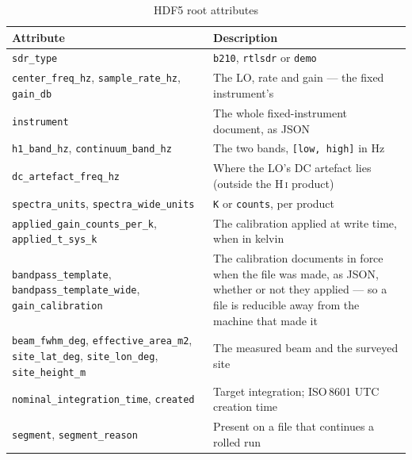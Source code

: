 \documentclass[11pt,a4paper]{article}
\begin{document}
\begin{table}[H]
\centering
\caption{HDF5 root attributes}
\small
\begin{tabular}{lp{9.4cm}}
\toprule
\textbf{Attribute} & \textbf{Description} \\
\midrule
\texttt{sdr\_type} & \texttt{b210}, \texttt{rtlsdr} or \texttt{demo} \\
\texttt{center\_freq\_hz}, \texttt{sample\_rate\_hz}, \texttt{gain\_db} & The LO, rate and gain --- the fixed instrument's \\
\texttt{instrument} & The whole fixed-instrument document, as JSON \\
\texttt{h1\_band\_hz}, \texttt{continuum\_band\_hz} & The two bands, \texttt{[low, high]} in Hz \\
\texttt{dc\_artefact\_freq\_hz} & Where the LO's DC artefact lies (outside the H\,\textsc{i} product) \\
\texttt{spectra\_units}, \texttt{spectra\_wide\_units} & \texttt{K} or \texttt{counts}, per product \\
\texttt{applied\_gain\_counts\_per\_k}, \texttt{applied\_t\_sys\_k} & The calibration applied at write time, when in kelvin \\
\texttt{bandpass\_template}, \texttt{bandpass\_template\_wide}, \texttt{gain\_calibration} & The calibration documents in force when the file was made, as JSON, whether or not they applied --- so a file is reducible away from the machine that made it \\
\texttt{beam\_fwhm\_deg}, \texttt{effective\_area\_m2}, \texttt{site\_lat\_deg}, \texttt{site\_lon\_deg}, \texttt{site\_height\_m} & The measured beam and the surveyed site \\
\texttt{nominal\_integration\_time}, \texttt{created} & Target integration; ISO\,8601 UTC creation time \\
\texttt{segment}, \texttt{segment\_reason} & Present on a file that continues a rolled run \\
\bottomrule
\end{tabular}
\end{table}
\end{document}
